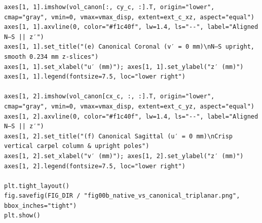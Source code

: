 \documentclass[10pt,a4paper]{article}
\renewcommand{\_}{\origunderscore\allowbreak}
\begin{document}
\begin{codebox}
\begin{lstlisting}[style=pybmed]
axes[1, 1].imshow(vol_canon[:, cy_c, :].T, origin="lower", cmap="gray", vmin=0, vmax=vmax_disp, extent=ext_c_xz, aspect="equal")
axes[1, 1].axvline(0, color="#f1c40f", lw=1.4, ls="--", label="Aligned N–S || z′")
axes[1, 1].set_title("(e) Canonical Coronal (v′ = 0 mm)\nN–S upright, smooth 0.234 mm z-slices")
axes[1, 1].set_xlabel("u′ (mm)"); axes[1, 1].set_ylabel("z′ (mm)")
axes[1, 1].legend(fontsize=7.5, loc="lower right")

axes[1, 2].imshow(vol_canon[cx_c, :, :].T, origin="lower", cmap="gray", vmin=0, vmax=vmax_disp, extent=ext_c_yz, aspect="equal")
axes[1, 2].axvline(0, color="#f1c40f", lw=1.4, ls="--", label="Aligned N–S || z′")
axes[1, 2].set_title("(f) Canonical Sagittal (u′ = 0 mm)\nCrisp vertical carpel column & upright poles")
axes[1, 2].set_xlabel("v′ (mm)"); axes[1, 2].set_ylabel("z′ (mm)")
axes[1, 2].legend(fontsize=7.5, loc="lower right")

plt.tight_layout()
fig.savefig(FIG_DIR / "fig00b_native_vs_canonical_triplanar.png", bbox_inches="tight")
plt.show()
\end{lstlisting}
\end{codebox}
\end{document}
